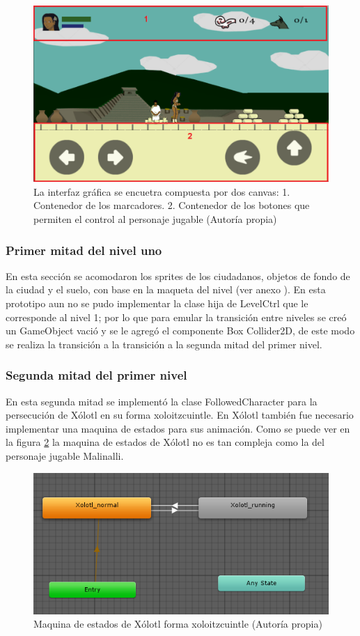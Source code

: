 \begin{figure}
  \centering
   \includegraphics[width=0.4 \textwidth]{05TrabajoRealizado/03Unity/imagenes/03Interfaz}
  \caption{La interfaz gráfica se encuetra compuesta por dos canvas: 1. Contenedor de los marcadores. 2. Contenedor de los botones que permiten el control al personaje jugable (Autoría propia)}
  \label{figCanvasM}
\end{figure}

\subsubsection{Primer mitad del nivel uno}
En esta sección se acomodaron los sprites de los ciudadanos, objetos de fondo de la
 ciudad y el suelo, con base en la maqueta del nivel (ver anexo ). En esta prototipo 
 aun no se pudo implementar la clase hija de LevelCtrl que le corresponde al nivel 1; 
 por lo que para emular la transición entre niveles se creó un GameObject vació y se 
 le agregó el componente Box Collider2D, de este modo se realiza la transición a  
 la transición a la segunda mitad del primer nivel.
 
 \subsubsection{Segunda mitad del primer nivel}
 En esta segunda mitad se implementó la clase FollowedCharacter para la persecución 
 de Xólotl en su forma xoloitzcuintle. En Xólotl también fue necesario implementar 
 una maquina de estados para sus animación. Como se puede ver en la figura \ref{figAniXolo} la  maquina de estados de Xólotl no es tan compleja como la del 
 personaje jugable Malinalli.   
 
 \begin{figure}
  \centering
   \includegraphics[width=0.4 \textwidth]{05TrabajoRealizado/03Unity/imagenes/03MaquinaEstadosXolotl}
  \caption{Maquina de estados de Xólotl forma xoloitzcuintle (Autoría propia)}
  \label{figAniXolo}
\end{figure}